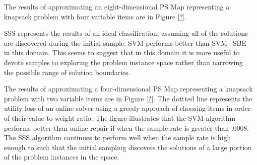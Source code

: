 
The results of approximating an eight-dimensional PS Map representing a knapsack problem with four variable items are in Figure \ref{?}.  




SSS represents the results of an ideal classification, assuming all of the solutions are discovered during the initial sample.  SVM performs better than SVM+SBE in this domain.  This seems to suggest that in this domain it is more useful to devote samples to exploring the problem instance space rather than narrowing the possible range of solution boundaries.

The results of approximating a four-dimensional PS Map representing a knapsack problem with two variable items are in Figure \ref{?}.  The dottted line represents the utility loss of an online solver using a greedy approach of choosing items in order of their value-to-weight ratio.  The figure illustrates that the SVM algorithm performs better than online repair if when the sample rate is greater than .0008.  The SSS algorithm continues to perform well when the sample rate is high enough to such that the initial sampling discovers the solutions of a large portion of the problem instances in the space.




